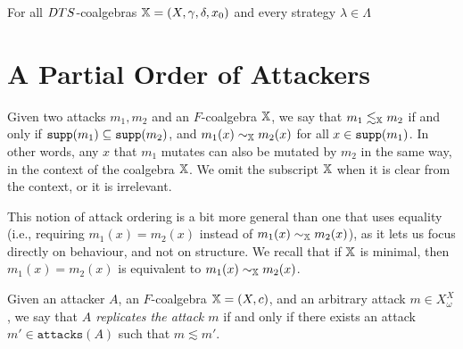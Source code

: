 \begin{proposition}
For all $DTS$-coalgebras ${\mathbb{X}}=(X,\gamma,\delta,x_0)$ and every strategy $\lambda\in\Lambda$
\end{proposition}
 
 \section{A Partial Order of Attackers}

\begin{definition}
Given two attacks $m_1, m_2$ and an $F$-coalgebra ${\mathbb{X}}$, we say that $m_1\lesssim_{\mathbb{X}} m_2$ if and only if ${\texttt{supp}}(m_1) \subseteq {\texttt{supp}}(m_2)$, and $m_1(x)\sim_{\mathbb{X}} m_2(x)$ for all $x\in {\texttt{supp}}(m_1)$. In other words, any $x$ that $m_1$ mutates can also be mutated by $m_2$ in the same way, in the context of the coalgebra ${\mathbb{X}}$. We omit the subscript ${\mathbb{X}}$ when it is clear from the context, or it is irrelevant.
\end{definition}
This notion of attack ordering is a bit more general than one that uses equality (i.e., requiring $m_1(x)= m_2(x)$ instead of $m_1(x)\sim_{\mathbb{X}} m_2(x)$), as it lets us focus directly on behaviour, and not on structure. We recall that if ${\mathbb{X}}$ is minimal, then $m_1(x)= m_2(x)$ is equivalent to $m_1(x)\sim_{\mathbb{X}} m_2(x)$.

\begin{definition}
Given an attacker $A$, an $F$-coalgebra ${\mathbb{X}}=(X,c)$, and an arbitrary attack $m\in X_\omega^X$, we say that \emph{$A$ replicates the attack $m$} if and only if there exists an attack $m'\in \texttt{attacks}(A)$ such that $m\lesssim m'$.
\end{definition}




